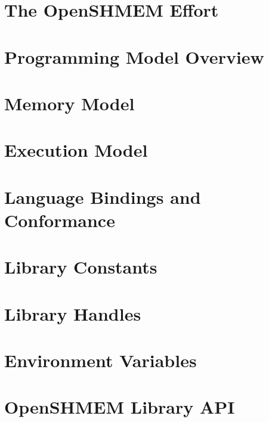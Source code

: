 \documentclass[10pt,oneside]{book}
\begin{document}




\section{The OpenSHMEM Effort}\label{subsec:openshmem_effort}


\section{Programming Model Overview}\label{subsec:programming_model}


\section{Memory Model}\label{subsec:memory_model}


\section{Execution Model}\label{subsec:execution_model}


\section{Language Bindings and Conformance}\label{subsec:bindings}


\section{Library Constants}\label{subsec:library_constants}


\section{Library Handles}\label{subsec:library_handles}


\section{Environment Variables }\label{subsec:environment_variables}


\clearpage



\section{OpenSHMEM Library \acs{API}}\label{sec:openshmem_library_api}
\end{document}
